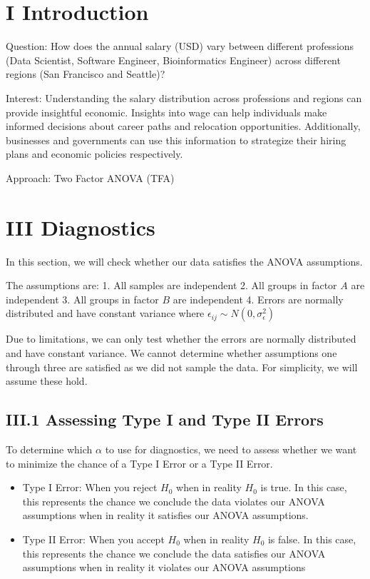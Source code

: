 \documentclass[
]{article}
\author{}
\date{\vspace{-2.5em}}
\providecommand{\tightlist}{%
  \setlength{\itemsep}{0pt}\setlength{\parskip}{0pt}}
\begin{document}
\section{I Introduction}\label{i-introduction}

Question: How does the annual salary (USD) vary between different
professions (Data Scientist, Software Engineer, Bioinformatics Engineer)
across different regions (San Francisco and Seattle)?

Interest: Understanding the salary distribution across professions and
regions can provide insightful economic. Insights into wage can help
individuals make informed decisions about career paths and relocation
opportunities. Additionally, businesses and governments can use this
information to strategize their hiring plans and economic policies
respectively.

Approach: Two Factor ANOVA (TFA)

\newpage

\section{III Diagnostics}\label{iii-diagnostics}

In this section, we will check whether our data satisfies the ANOVA
assumptions.

The assumptions are: 1. All samples are independent 2. All groups in
factor \(A\) are independent 3. All groups in factor \(B\) are
independent 4. Errors are normally distributed and have constant
variance where \(ϵ_{ij} \sim N(0, \sigma_\epsilon^2)\)

Due to limitations, we can only test whether the errors are normally
distributed and have constant variance. We cannot determine whether
assumptions one through three are satisfied as we did not sample the
data. For simplicity, we will assume these hold.

\subsection{III.1 Assessing Type I and Type II
Errors}\label{iii.1-assessing-type-i-and-type-ii-errors}

To determine which \(\alpha\) to use for diagnostics, we need to assess
whether we want to minimize the chance of a Type I Error or a Type II
Error.

\begin{itemize}
\tightlist
\item
  Type I Error: When you reject \(H_0\) when in reality \(H_0\) is true.
  In this case, this represents the chance we conclude the data violates
  our ANOVA assumptions when in reality it satisfies our ANOVA
  assumptions.
\item
  Type II Error: When you accept \(H_0\) when in reality \(H_0\) is
  false. In this case, this represents the chance we conclude the data
  satisfies our ANOVA assumptions when in reality it violates our ANOVA
  assumptions
\end{itemize}
\end{document}
